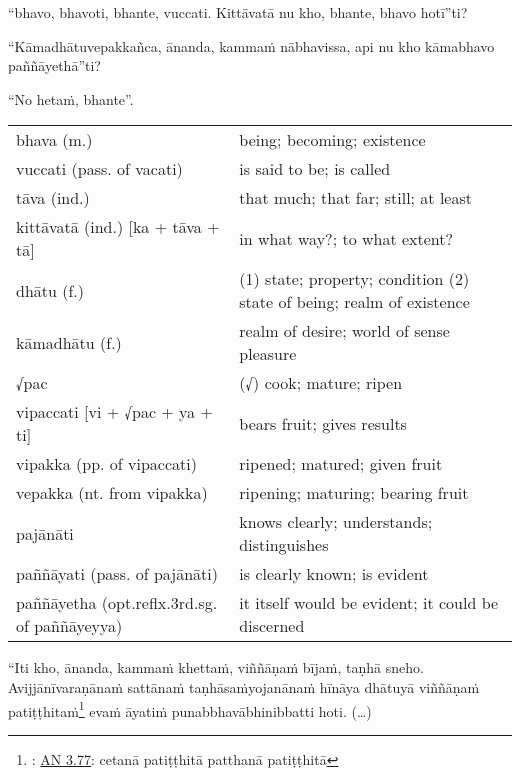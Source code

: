\documentclass[11pt,oneside]{memoir}
\begin{document}
\begin{spacedquote}
“bhavo, bhavoti, bhante, vuccati. Kittāvatā nu kho, bhante, bhavo hotī”ti?

“Kāmadhātuvepakkañca, ānanda, kammaṁ nābhavissa, api nu kho kāmabhavo paññāyethā”ti?

“No hetaṁ, bhante”.
\end{spacedquote}

\begin{longtable}{L{\colOne} L{\colTwo}}
bhava (m.) & being; becoming; existence\\[0pt]
vuccati (pass. of vacati) & is said to be; is called\\[0pt]
tāva (ind.) & that much; that far; still; at least\\[0pt]
kittāvatā (ind.) [ka + tāva + tā] & in what way?; to what extent?\\[0pt]
dhātu (f.) & (1) state; property; condition (2) state of being; realm of existence\\[0pt]
kāmadhātu (f.) & realm of desire; world of sense pleasure\\[0pt]
√pac & (√) cook; mature; ripen\\[0pt]
vipaccati [vi + √pac + ya + ti] & bears fruit; gives results\\[0pt]
vipakka (pp. of vipaccati) & ripened; matured; given fruit\\[0pt]
vepakka (nt. from vipakka) & ripening; maturing; bearing fruit\\[0pt]
pajānāti & knows clearly; understands; distinguishes\\[0pt]
paññāyati (pass. of pajānāti) & is clearly known; is evident\\[0pt]
paññāyetha (opt.reflx.3rd.sg. of paññāyeyya) & it itself would be evident; it could be discerned\\[0pt]
\end{longtable}

\clearpage

\begin{spacedquote}
“Iti kho, ānanda, kammaṁ khettaṁ, viññāṇaṁ bījaṁ, taṇhā sneho. Avijjānīvaraṇānaṁ
sattānaṁ taṇhāsaṁyojanānaṁ hīnāya dhātuyā viññāṇaṁ
patiṭṭhitaṁ\footnote{: \href{https://suttacentral.net/an3.77/en/sujato}{AN 3.77}: cetanā patiṭṭhitā patthanā patiṭṭhitā} evaṁ āyatiṁ punabbhavābhinibbatti hoti. (…)
\end{spacedquote}
\end{document}
